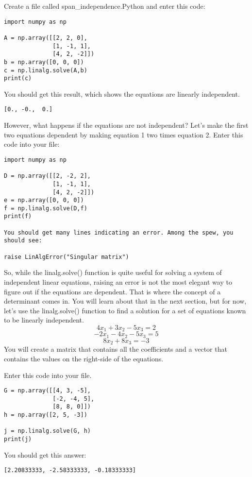 Create a file called span\_independence.Python and enter this code:
\begin{Verbatim}
import numpy as np

A = np.array([[2, 2, 0], 
              [1, -1, 1],
              [4, 2, -2]])
b = np.array([0, 0, 0])
c = np.linalg.solve(A,b)
print(c)
\end{Verbatim}
You should get this result, which shows the equations are linearly independent.
\begin{Verbatim}
[0., -0.,  0.]
\end{Verbatim}
However, what happens if the equations are not independent? Let's make the 
first two equations dependent by making equation 1 two times equation 2. Enter 
this code into your file:
\begin{Verbatim}
import numpy as np

D = np.array([[2, -2, 2], 
              [1, -1, 1],
              [4, 2, -2]])
e = np.array([0, 0, 0])
f = np.linalg.solve(D,f)
print(f)

You should get many lines indicating an error. Among the spew, you should see:

raise LinAlgError("Singular matrix")
\end{Verbatim}
So, while the linalg.solve() function is quite useful for solving a system of 
independent linear equations, raising an error is not the most elegant way to 
figure out if the equations are dependent. That is where the concept of a 
determinant comes in. You will learn about that in the next section, but for 
now, let's use the  linalg.solve() function to find a solution for a set of 
equations known to be linearly independent.
$$4x_1 + 3x_2 - 5x_3 = 2$$
$$-2x_1- 4x_2 - 5x_3 = 5$$
$$       8x_2 + 8x_3  = -3$$
You will create a matrix that contains all the coefficients and a vector that 
contains the values on the right-side of the equations. 

Enter this code into your file. 
\begin{Verbatim}
G = np.array([[4, 3, -5], 
              [-2, -4, 5], 
              [8, 8, 0]])
h = np.array([2, 5, -3])

j = np.linalg.solve(G, h)
print(j)
\end{Verbatim}
You should get this answer:
\begin{Verbatim}
[2.20833333, -2.58333333, -0.18333333]
\end{Verbatim}

